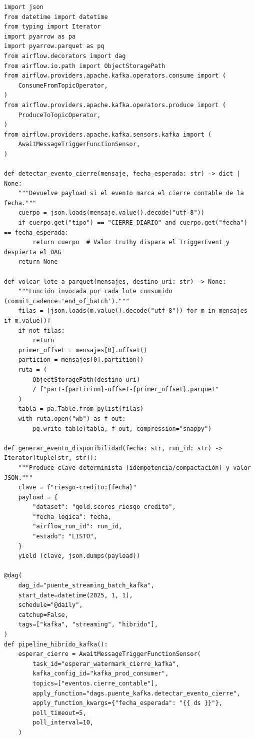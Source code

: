 \begin{lstlisting}[style=python, caption={Pipeline híbrido Kafka <-> Airflow con sensor deferrable, consumo acotado a Parquet y publicación de eventos.}, label={lst:kafka-pipeline-hibrido}]
import json
from datetime import datetime
from typing import Iterator
import pyarrow as pa
import pyarrow.parquet as pq
from airflow.decorators import dag
from airflow.io.path import ObjectStoragePath
from airflow.providers.apache.kafka.operators.consume import (
    ConsumeFromTopicOperator,
)
from airflow.providers.apache.kafka.operators.produce import (
    ProduceToTopicOperator,
)
from airflow.providers.apache.kafka.sensors.kafka import (
    AwaitMessageTriggerFunctionSensor,
)

def detectar_evento_cierre(mensaje, fecha_esperada: str) -> dict | None:
    """Devuelve payload si el evento marca el cierre contable de la fecha."""
    cuerpo = json.loads(mensaje.value().decode("utf-8"))
    if cuerpo.get("tipo") == "CIERRE_DIARIO" and cuerpo.get("fecha") == fecha_esperada:
        return cuerpo  # Valor truthy dispara el TriggerEvent y despierta el DAG
    return None

def volcar_lote_a_parquet(mensajes, destino_uri: str) -> None:
    """Función invocada por cada lote consumido (commit_cadence='end_of_batch')."""
    filas = [json.loads(m.value().decode("utf-8")) for m in mensajes if m.value()]
    if not filas:
        return
    primer_offset = mensajes[0].offset()
    particion = mensajes[0].partition()
    ruta = (
        ObjectStoragePath(destino_uri)
        / f"part-{particion}-offset-{primer_offset}.parquet"
    )
    tabla = pa.Table.from_pylist(filas)
    with ruta.open("wb") as f_out:
        pq.write_table(tabla, f_out, compression="snappy")

def generar_evento_disponibilidad(fecha: str, run_id: str) -> Iterator[tuple[str, str]]:
    """Produce clave determinista (idempotencia/compactación) y valor JSON."""
    clave = f"riesgo-credito:{fecha}"
    payload = {
        "dataset": "gold.scores_riesgo_credito",
        "fecha_logica": fecha,
        "airflow_run_id": run_id,
        "estado": "LISTO",
    }
    yield (clave, json.dumps(payload))

@dag(
    dag_id="puente_streaming_batch_kafka",
    start_date=datetime(2025, 1, 1),
    schedule="@daily",
    catchup=False,
    tags=["kafka", "streaming", "hibrido"],
)
def pipeline_hibrido_kafka():
    esperar_cierre = AwaitMessageTriggerFunctionSensor(
        task_id="esperar_watermark_cierre_kafka",
        kafka_config_id="kafka_prod_consumer",
        topics=["eventos.cierre_contable"],
        apply_function="dags.puente_kafka.detectar_evento_cierre",
        apply_function_kwargs={"fecha_esperada": "{{ ds }}"},
        poll_timeout=5,
        poll_interval=10,
    )


\end{lstlisting}
